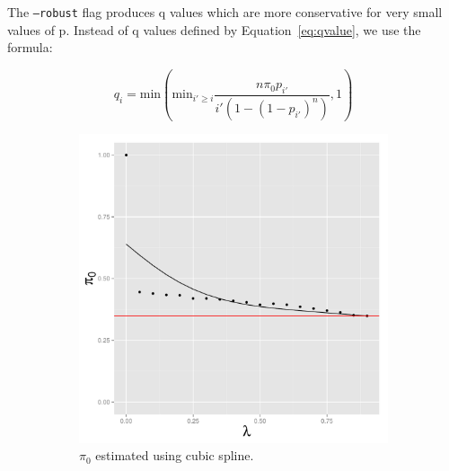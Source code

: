 \documentclass{amsart}
\begin{document}
The \texttt{--robust} flag produces q values which are more conservative for very small values of p. Instead of q values defined by Equation~\ref{eq:qvalue}, we use the formula:

\begin{equation}
\label{eq:robust}
q_i = \text{min}(\text{min}_{i' \geq i} \frac{n \pi_0p_{i'}} {i'(1 - (1 - p_{i'})^n) }, 1)
\end{equation}

\begin{figure}
  \centering
  \begin{subfigure}[b]{0.5\textwidth}
    \includegraphics[width=\textwidth]{simple_diagnostic}
   \caption{$\pi_0$ estimated using cubic spline.}
   \label{fig:spline_param}
  \end{subfigure}~
  \begin{subfigure}[b]{0.5\textwidth}

\end{subfigure}
\end{figure}
\end{document}
